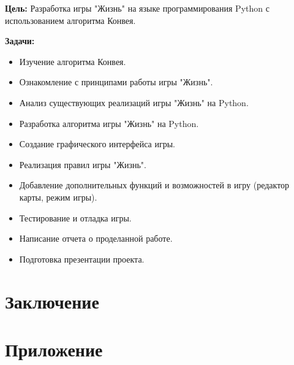 \documentclass[14pt, oneside]{altsu-report}
\begin{document}
\textbf{Цель:} Разработка игры "Жизнь" на языке программирования Python с использованием алгоритма Конвея.

\textbf{Задачи:}
\begin{itemize}
    \item Изучение алгоритма Конвея.
    \item Ознакомление с принципами работы игры "Жизнь".
    \item Анализ существующих реализаций игры "Жизнь" на Python.
    \item Разработка алгоритма игры "Жизнь" на Python.
    \item Создание графического интерфейса игры.
    \item Реализация правил игры "Жизнь".
    \item Добавление дополнительных функций и возможностей в игру (редактор карты, режим игры).
    \item Тестирование и отладка игры.
    \item Написание отчета о проделанной работе.
    \item Подготовка презентации проекта.
\end{itemize}





\chapter*{Заключение}

\newpage
{}
\printbibliography[title={Список использованной литературы}]

\appendix
\newpage
\chapter*{\raggedleft\label{appendix1}Приложение}

\begin{center}
\label{code:appendix}
\end{center}

\begin{code}

\end{code}
\end{document}
